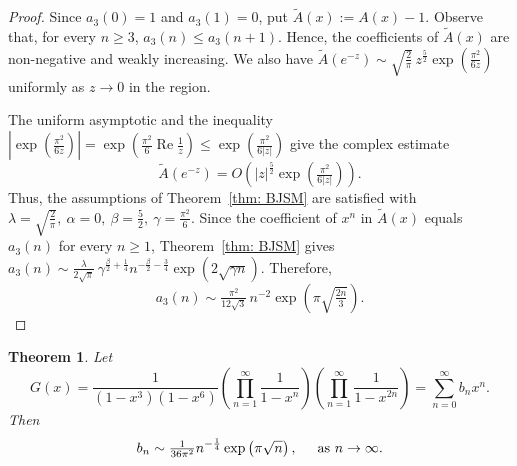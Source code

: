 \documentclass[12pt,a4paper]{amsart}
\numberwithin{equation}{section}
\theoremstyle{plain}
\newtheorem{thm}{Theorem}[section]
\theoremstyle{definition}
\theoremstyle{remark}
\begin{document}
\begin{proof}
Since $a_3(0)=1$ and $a_3(1)=0$, put
$
\widetilde A(x):=A(x)-1.
$
Observe that, for every $n\ge3$,
$
a_3(n)\le  a_3(n+1).
$ 
Hence, the coefficients of $\widetilde A(x)$ are non-negative and weakly increasing.
We also have
$
\widetilde A(e^{-z})
\sim
\sqrt{\frac{2}{\pi}}\,
z^{\frac{5}{2}}
\exp\left(\frac{\pi^2}{6z}\right)
$ uniformly as $z\to0$ in the region.

The uniform asymptotic and the inequality
$
\left|
\exp\left(\frac{\pi^2}{6z}\right)
\right|
=
\exp\left(
\frac{\pi^2}{6}\operatorname{Re}\frac1z
\right)
\le
\exp\left(\frac{\pi^2}{6|z|}\right)
$
give the complex estimate
$$
\widetilde A(e^{-z})
=
O\left(
|z|^{\frac{5}{2}}
\exp\left(\tfrac{\pi^2}{6|z|}\right)
\right).
$$
Thus, the assumptions of Theorem~\ref{thm: BJSM} are satisfied with
$
\lambda=\sqrt{\frac{2}{\pi}},
\
\alpha=0,
\
\beta=\frac52,
\
\gamma=\frac{\pi^2}{6}.
$
Since the coefficient of $x^n$ in $\widetilde A(x)$ equals $a_3(n)$ for every $n\geq1$, Theorem~\ref{thm: BJSM} gives
$
a_3(n)
\sim
\frac{\lambda}{2\sqrt\pi}\,
\gamma^{\frac{\beta}{2}+\frac{1}{4}}
n^{-\frac{\beta}{2}-\frac{3}{4}}
\exp\left(2\sqrt{\gamma n}\right).
$
Therefore,
$$
a_3(n)
\sim
\tfrac{\pi^2}{12\sqrt3}\,
n^{-2}
\exp\left(\pi\sqrt{\tfrac{2n}{3}}\right).
$$
\end{proof}





\begin{thm}\label{Gc}
Let
\begin{equation}\label{eq:G-coefficients}
G(x)=\frac{1}{(1-x^3)(1-x^6)}
\left(\prod_{n=1}^\infty\frac{1}{1-x^n}\right)
\left(\prod_{n=1}^\infty\frac{1}{1-x^{2n}}\right)
=
\sum_{n=0}^{\infty}b_nx^n.
\end{equation}
Then
$$
b_n
\sim
\tfrac{1}{36\pi^2}
n^{-\frac{1}{4}}
\exp\left(\pi\sqrt n\right),
\hspace{0.5cm}\text{as }n\to\infty.
$$
\end{thm}
\end{document}
